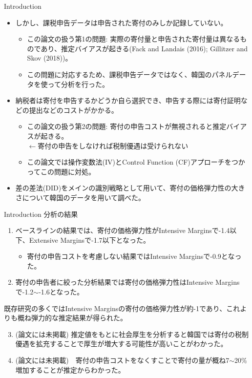 \documentclass[dvipdfmx,10pt]{beamer}
\begin{document}
	\begin{frame}{Introduction}
		\protect\hypertarget{introduction-1}{}
		\begin{itemize}
			\item しかし、課税申告データは申告された寄付のみしか記録していない。
			\begin{itemize}
				\item この論文の扱う第1の問題: 実際の寄付量と申告された寄付量は異なるものであり、推定バイアスが起きる(Fack and Landais (2016); Gillitzer and Skov (2018))。
				\item この問題に対応するため、課税申告データではなく、韓国のパネルデータを使って分析を行った。
			\end{itemize}
			\item 納税者は寄付を申告するかどうか自ら選択でき、申告する際には寄付証明などの提出などのコストがかかる。			
			\begin{itemize}
				\item この論文の扱う第2の問題: 寄付の申告コストが無視されると推定バイアスが起きる。\\
				$\leftarrow$寄付の申告をしなければ税制優遇は受けられない
				\item この論文では操作変数法(IV)とControl Function (CF)アプローチをつかってこの問題に対処。
			\end{itemize}
			\item 差の差法(DID)をメインの識別戦略として用いて、寄付の価格弾力性の大きさについて韓国のデータを用いて調べた。
		\end{itemize}
	\end{frame}
	
	\begin{frame}{Introduction}
		\protect\hypertarget{introduction-2}{}
		分析の結果
		\begin{enumerate}
			\item ベースラインの結果では、寄付の価格弾力性がIntensive Marginsで-1.4以下、Extensive Marginsで-1.7以下となった。
			\begin{itemize}
				\item 寄付の申告コストを考慮しない結果ではIntensive Marginsで-0.9となった。
			\end{itemize}
			\item 寄付の申告者に絞った分析結果では寄付の価格弾力性はIntensive Marginsで-1.2\(\sim\)-1.6となった。
		\end{enumerate}
		既存研究の多くではIntensive Marginsの寄付の価格弾力性が約-1であり、これよりも概ね弾力的な推定結果が得られた。
		\begin{enumerate}
			\setcounter{enumi}{2}
			\item (論文には未掲載) 推定値をもとに社会厚生を分析すると韓国では寄付の税制優遇を拡充することで厚生が増大する可能性が高いことがわかった。
			\item (論文には未掲載)　寄付の申告コストをなくすことで寄付の量が概ね7$\sim$20\%増加することが推定からわかった。
		\end{enumerate}
	\end{frame}
	
\end{document}
